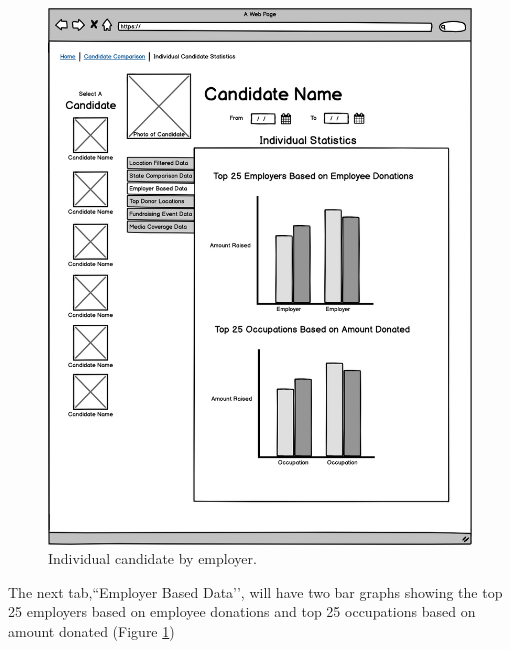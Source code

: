 \documentclass[12pt]{article}
\begin{document}
    \begin{figure}[H]
        \begin{center}
        \includegraphics[scale=.30]{candidateemployer}
        \caption{Individual candidate by employer.}
        \label{fig:11}
        \end{center}
    \end{figure}
    The next tab,``Employer Based Data’’, will have two bar graphs showing the top 25 employers based on employee donations and top 25 occupations based on amount donated (Figure \ref{fig:11})
\end{document}
